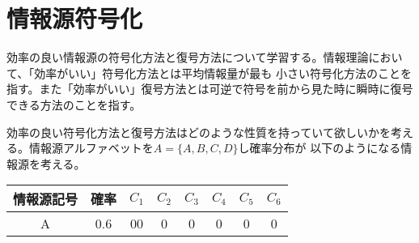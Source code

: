 \documentclass{jlreq}
\begin{document}
\section{情報源符号化}
効率の良い情報源の符号化方法と復号方法について学習する。情報理論において、「効率がいい」符号化方法とは平均情報量が最も
小さい符号化方法のことを指す。また「効率がいい」復号方法とは可逆で符号を前から見た時に瞬時に復号できる方法のことを指す。

効率の良い符号化方法と復号方法はどのような性質を持っていて欲しいかを考える。情報源アルファベットを$A = \{A, B, C, D\}$し確率分布が
以下のようになる情報源を考える。

\begin{table}[h]
  \centering
  \begin{tabular}{|c|c|c|c|c|c|c|c|}
    \hline
    情報源記号 & 確率 & $C_1$ & $C_2$ & $C_3$ & $C_4$ & $C_5$  & $C_6$ \\
    \hline
    A & 0.6 & 00 & 0 & 0 & 0 & 0 & 0\\
    \hline
  \end{tabular}
\end{table}
\end{document}
